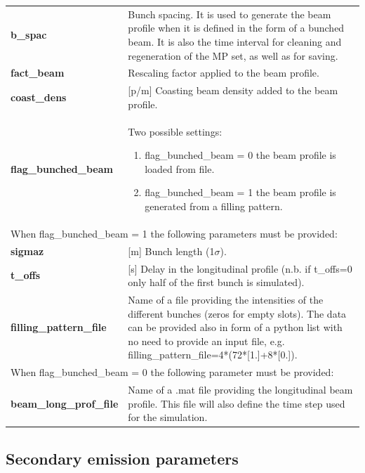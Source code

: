 \documentclass[a4paper,12pt]{article}
\begin{document}
\begin{longtable}{p{}p{}}
\hline\endfirsthead\hline\endhead\rowcolor{Gray}
\multicolumn{2}{p{.97\textwidth}}{
\textbf{Beam longitudinal profile}}\\ \hline
\textbf{b\_spac}&	Bunch spacing. It is used to generate the beam profile when it is defined in the form of a bunched beam. It is also the time interval for cleaning and regeneration of the MP set, as well as for saving.\\ \hline
\textbf{fact\_beam}&	Rescaling factor applied to the beam profile.\\ \hline
\textbf{coast\_dens}&	[p/m] Coasting beam density added to the beam profile. \\ \hline
\textbf{flag\_bunched\_beam}&	Two possible settings:
\begin{enumerate}
\item flag\_bunched\_beam = 0 the beam profile is loaded from file.
\item flag\_bunched\_beam = 1 the beam profile is generated from a filling pattern.
\end{enumerate}\\ \hline
\multicolumn{2}{p{.97\textwidth}}{
When flag\_bunched\_beam = 1 the following parameters must be provided:}\\ \hline
\textbf{sigmaz}&	[m] Bunch length (1$\sigma$). \\ \hline
\textbf{t\_offs}&	[s] Delay in the longitudinal profile (n.b. if t\_offs=0 only half of the first bunch is simulated).\\ \hline
\textbf{filling\_pattern\_file}&	Name of a file providing the intensities of the different bunches (zeros for empty slots). 
The data can be provided also in form of a python list with no need to provide an input file, e.g. filling\_pattern\_file=4*(72*[1.]+8*[0.]).\\ \hline
\multicolumn{2}{p{.97\textwidth}}{
When flag\_bunched\_beam = 0 the following parameter must be provided:}\\ \hline
\textbf{beam\_long\_prof\_file}&	Name of a .mat file providing the longitudinal beam profile. This file will also define the time step used for the simulation.\\
\hline
\end{longtable}


\newpage\subsection{Secondary emission parameters}
\end{document}
